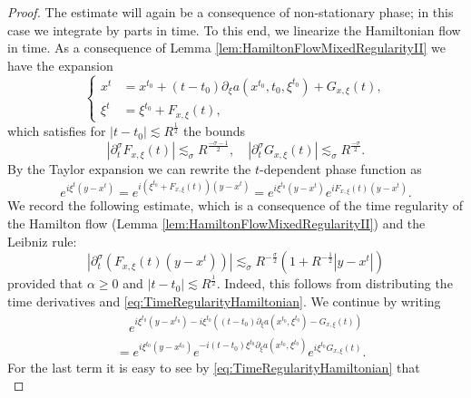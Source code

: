 \documentclass{amsart}
\theoremstyle{definition}
\begin{document}
\begin{proof}
The estimate will again be a consequence of non-stationary phase; in this case we integrate by parts in time. To this end, we linearize the Hamiltonian flow in time. As a consequence of Lemma \ref{lem:HamiltonFlowMixedRegularityII} we have the expansion
\begin{equation*}
\left\{ \begin{array}{cl}
x^t &= x^{t_0} + (t-t_0) \partial_{\xi} a(x^{t_0},t_0,\xi^{t_0}) + G_{x,\xi}(t), \\
\xi^t &= \xi^{t_0} + F_{x,\xi}(t),
\end{array} \right.
\end{equation*}
which satisfies for $|t-t_0| \lesssim R^{\frac{1}{2}}$ the bounds
\begin{equation}
\label{eq:TimeRegularityHamiltonian}
|\partial_t^{\sigma} F_{x,\xi}(t) | \lesssim_{\sigma} R^{\frac{-\sigma-1}{2}}, \quad |\partial_t^{\sigma} G_{x,\xi}(t)| \lesssim_{\sigma} R^{\frac{-\sigma}{2}}.
\end{equation}
By the Taylor expansion we can rewrite the $t$-dependent phase function as
\begin{equation*}
e^{i \xi^t(y-x^t)} = e^{i (\xi^{t_0} + F_{x,\xi}(t))(y-x^t)} = e^{i \xi^{t_0} (y-x^t)} e^{i F_{x,\xi}(t) (y-x^t)}.
\end{equation*}
We record the following estimate, which is a consequence of the time regularity of the Hamilton flow (Lemma \ref{lem:HamiltonFlowMixedRegularityII}) and the Leibniz rule:
\begin{equation}
\label{eq:TimeRegularityPhaseFunctionI}
| \partial_t^{\sigma} ( F_{x,\xi}(t) (y-x^t))| \lesssim_{\sigma} R^{-\frac{\sigma}{2}} (1+R^{-\frac{1}{2}} |y-x^t|)
\end{equation}
provided that $\alpha \geq 0$ and $|t-t_0| \lesssim R^{\frac{1}{2}}$. Indeed, this follows from distributing the time derivatives and \eqref{eq:TimeRegularityHamiltonian}. We continue by writing
\begin{equation*}
\begin{split}
&\quad e^{i \xi^{t_0} (y-x^{t_0}) - i \xi^{t_0} ((t-t_0) \partial_{\xi} a (x^{t_0},\xi^{t_0}) - G_{x,\xi}(t))} \\
&= e^{i \xi^{t_0} (y- x^{t_0})} e^{-i (t-t_0) \xi^{t_0} \partial_{\xi} a(x^{t_0}, \xi^{t_0})} e^{i \xi^{t_0} G_{x,\xi}(t)}.
\end{split}
\end{equation*}
For the last term it is easy to see by \eqref{eq:TimeRegularityHamiltonian} that
\begin{equation}

\end{equation}
\end{proof}
\end{document}
